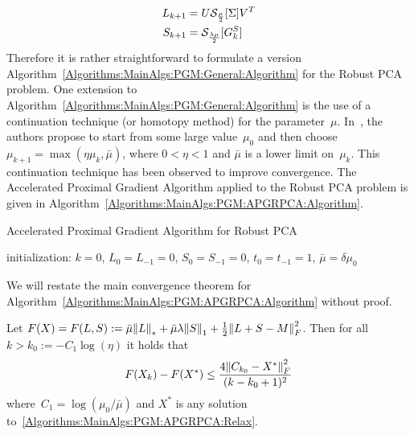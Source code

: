 \documentclass{../../common/projectreport}
\begin{document}
\begin{align}
L_{k+1} &= U {\mathcal{S}}_\frac{\mu}{2}[\Sigma] V^T \label{Algorithms:MainAlgs:PGM:APGRPCA:LIterate} \\
S_{k+1} &= {\mathcal{S}}_\frac{\lambda\mu}{2}[G_k^S] \label{Algorithms:MainAlgs:PGM:APGRPCA:SIterate}
\end{align}
Therefore it is rather straightforward to formulate a version Algorithm~\ref{Algorithms:MainAlgs:PGM:General:Algorithm} for the Robust PCA problem. One extension to Algorithm~\ref{Algorithms:MainAlgs:PGM:General:Algorithm} is the use of a continuation technique (or homotopy method) for the parameter~$\mu$. In~\cite{Lin:2009kx}, the authors propose to start from some large value~$\mu_0$ and then choose~$\mu_{k+1} = \max(\eta \mu_k,\bar{\mu})$, where $0<\eta<1$ and $\bar{\mu}$ is a lower limit on~$\mu_k$. This continuation technique has been observed to improve convergence. The Accelerated Proximal Gradient Algorithm applied to the Robust PCA problem is given in Algorithm~\ref{Algorithms:MainAlgs:PGM:APGRPCA:Algorithm}.
%
\begin{algorithm}
\caption{Accelerated Proximal Gradient Algorithm for Robust PCA}
initialization: $k=0$, $L_0=L_{-1}=0$, $S_0=S_{-1}= 0$, $t_0=t_{-1} = 1$, $\bar{\mu} = \delta \mu_0$\;
\label{Algorithms:MainAlgs:PGM:APGRPCA:Algorithm}
\end{algorithm}

We will restate the main convergence theorem for Algorithm~\ref{Algorithms:MainAlgs:PGM:APGRPCA:Algorithm} without proof. 

\begin{theorem}
Let $F(X) = F(L,S) := \bar{\mu} {\left\|L\right\|}_{*}^{} + \bar{\mu} \lambda {\left\|S\right\|}_{1}^{} + \frac{1}{2} {\left\|L+S-M\right\|}_{F}^{2}$. Then for all $k>k_0 := -C_1\log(\eta)$ it holds that
\begin{align*}
F(X_k) - F(X^*) \leq \frac{4{\left\|C_{k_0}-X^*\right\|}_{F}^{2}}{(k-k_0+1)^2}
\end{align*}
where~$C_1 = \log(\mu_0/\bar{\mu})$ and $X^*$ is any solution to~\eqref{Algorithms:MainAlgs:PGM:APGRPCA:Relax}.\\
\end{theorem}
\end{document}
